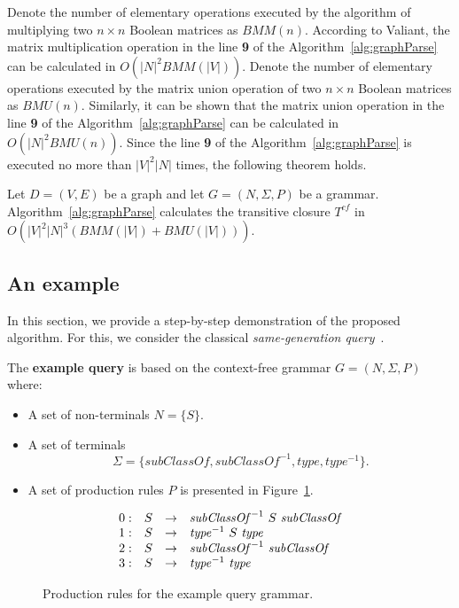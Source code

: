 \documentclass[runningheads,a4paper]{llncs}
\begin{document}
Denote the number of elementary operations executed by the algorithm of multiplying two $n \times n$ Boolean matrices as $BMM(n)$. According to Valiant, the matrix multiplication operation in the line \textbf{9} of the Algorithm~\ref{alg:graphParse} can be calculated in $O(|N|^2 BMM(|V|))$. Denote the number of elementary operations executed by the matrix union operation of two $n \times n$ Boolean matrices as $BMU(n)$. Similarly, it can be shown that the matrix union operation in the line \textbf{9} of the Algorithm~\ref{alg:graphParse} can be calculated in $O(|N|^2 BMU(n))$. Since the line \textbf{9} of the Algorithm~\ref{alg:graphParse} is executed no more than $|V|^2|N|$ times, the following theorem holds.

\begin{mytheorem}\label{thm:time}
	Let $D = (V,E)$ be a graph and let $G =(N,\Sigma,P)$ be a grammar. Algorithm~\ref{alg:graphParse} calculates the transitive closure $T^{cf}$ in $O(|V|^2|N|^3(BMM(|V|) + BMU(|V|)))$.
\end{mytheorem}



\subsection{An example} \label{section_example}
In this section, we provide a step-by-step demonstration of the proposed algorithm. For this, we consider the classical \textit{same-generation query}~\cite{FndDB}.

The \textbf{example query} is based on the context-free grammar $G = (N, \Sigma, P)$ where:
\begin{itemize}
	\item A set of non-terminals $N = \{S\}$.
	\item A set of terminals $$\Sigma = \{subClassOf, subClassOf^{-1}, type, type^{-1}\}.$$
	\item A set of production rules $P$ is presented in Figure~\ref{ProductionRulesExampleQuery}.
\end{itemize}

\begin{figure}[h]
	\[
	\begin{array}{rccl}
	0: & S & \rightarrow & \text{\textit{subClassOf}}^{-1} \ S \ \text{\textit{subClassOf}} \\ 
	1: & S & \rightarrow & \text{\textit{type}}^{-1} \ S \ \text{\textit{type}} \\ 
	2: & S & \rightarrow & \text{\textit{subClassOf}}^{-1} \ \text{\textit{subClassOf}} \\ 
	3: & S & \rightarrow & \text{\textit{type}}^{-1} \ \text{\textit{type}} \\ 
	\end{array}
	\]
	\caption{Production rules for the example query grammar.}
	\label{ProductionRulesExampleQuery}
\end{figure}
\end{document}
